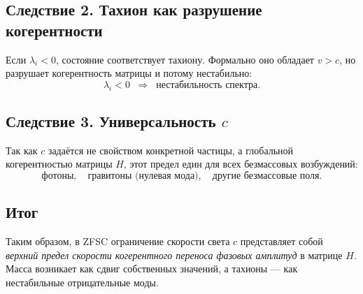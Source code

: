 \subsection*{Следствие 2. Тахион как разрушение когерентности}
Если $\lambda_i < 0$, состояние соответствует тахиону. Формально оно обладает $v > c$, но разрушает когерентность матрицы и потому нестабильно:
\[
\lambda_i < 0 \;\;\Rightarrow\;\; \text{нестабильность спектра}.
\]

\subsection*{Следствие 3. Универсальность $c$}
Так как $c$ задаётся не свойством конкретной частицы, а глобальной когерентностью матрицы $H$, этот предел един для всех безмассовых возбуждений:
\[
\text{фотоны}, \quad \text{гравитоны (нулевая мода)}, \quad \text{другие безмассовые поля}.
\]

\subsection*{Итог}
Таким образом, в ZFSC ограничение скорости света $c$ представляет собой \textit{верхний предел скорости когерентного переноса фазовых амплитуд} в матрице $H$. Масса возникает как сдвиг собственных значений, а тахионы — как нестабильные отрицательные моды.
